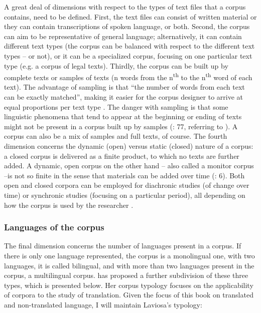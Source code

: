A great deal of dimensions with respect to the types of text files that a corpus contains, need to be defined. First, the text files can consist of written material or they can contain transcriptions of spoken language, or both. Second, the corpus can aim to be representative of general language; alternatively, it can contain different text types (the corpus can be balanced with respect to the different text types – or not), or it can be a specialized corpus, focusing on one particular text type (e.g. a corpus of legal texts). Thirdly, the corpus can be built up by complete texts or samples of texts (n words from the n\textsuperscript{th} to the n\textsuperscript{th} word of each text). The advantage of sampling is that “the number of words from each text can be exactly matched”, making it easier for the corpus designer to arrive at equal proportions per text type \citep[77]{deignan_metaphor_2005}. The danger with sampling is that some linguistic phenomena that tend to appear at the beginning or ending of texts might not be present in a corpus built up by samples (\citealt{deignan_metaphor_2005}: 77, referring to \citet{stubbs_text_1996}). A corpus can also be a mix of samples and full texts, of course. The fourth dimension concerns the dynamic (open) versus static (closed) nature of a corpus: a closed corpus is delivered as a finite product, to which no texts are further added. A dynamic, open corpus on the other hand – also called a monitor corpus –is not so finite in the sense that materials can be added over time (\citealt{mcenery_corpus_2012}: 6). Both open and closed corpora can be employed for diachronic studies (of change over time) or synchronic studies (focusing on a particular period), all depending on how the corpus is used by the researcher \citep[3]{johansson_role_1998}.


\subsubsection{\label{sec:2.2.1.3}  Languages of the corpus}

The final dimension concerns the number of languages present in a corpus. If there is only one language represented, the corpus is a monolingual one, with two languages, it is called bilingual, and with more than two languages present in the corpus, a multilingual corpus. \citet[36-38]{laviosa_corpus-based_2002} has proposed a further subdivision of these three types, which is presented below. Her corpus typology focuses on the applicability of corpora to the study of translation. Given the focus of this book on translated and non-translated language, I will maintain Laviosa’s typology:


